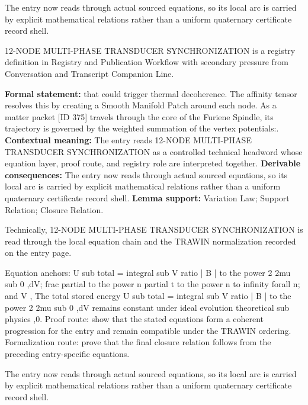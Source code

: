 The entry now reads through actual sourced equations, so its local arc is carried by explicit mathematical relations rather than a uniform quaternary certificate record shell.
\clearpage


\begingroup\small
{}
12-NODE MULTI-PHASE TRANSDUCER SYNCHRONIZATION is a registry definition in Registry and Publication Workflow with secondary pressure from Conversation and Transcript Companion Line.

\begingroup\footnotesize\setlength{\emergencystretch}{3em}\sloppy
\textbf{Formal statement:} that could trigger thermal decoherence. The affinity tensor resolves this by creating a Smooth Manifold Patch around each node. As a matter packet [ID 375] travels through the core of the Furiene Spindle, its trajectory is governed by the weighted summation of the vertex potentials:. \textbf{Contextual meaning:} The entry reads 12-NODE MULTI-PHASE TRANSDUCER SYNCHRONIZATION as a controlled technical headword whose equation layer, proof route, and registry role are interpreted together. \textbf{Derivable consequences:} The entry now reads through actual sourced equations, so its local arc is carried by explicit mathematical relations rather than a uniform quaternary certificate record shell. \textbf{Lemma support:} Variation Law; Support Relation; Closure Relation.\par
\endgroup

Technically, 12-NODE MULTI-PHASE TRANSDUCER SYNCHRONIZATION is read through the local equation chain and the TRAWIN normalization recorded on the entry page.

Equation anchors: U sub total = integral sub V ratio | B | to the power 2 2mu sub 0 ,dV; frac partial to the power n partial t to the power n to infinity forall n; and V , The total stored energy U sub total = integral sub V ratio | B | to the power 2 2mu sub 0 ,dV remains constant under ideal evolution theoretical sub physics ,0. Proof route: show that the stated equations form a coherent progression for the entry and remain compatible under the TRAWIN ordering. Formalization route: prove that the final closure relation follows from the preceding entry-specific equations.

The entry now reads through actual sourced equations, so its local arc is carried by explicit mathematical relations rather than a uniform quaternary certificate record shell.
\endgroup

